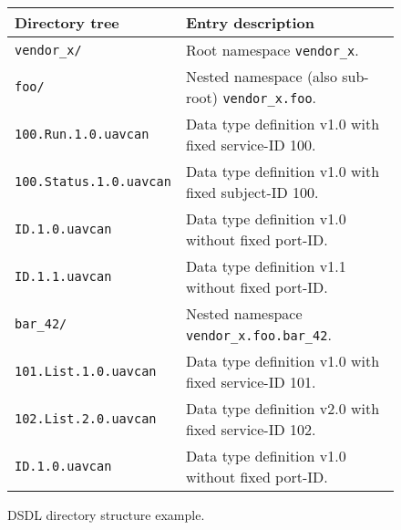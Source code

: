 \begin{remark}
    \begin{figure}[H]
        \begin{tabu}{|l|X|} \hline
            \rowfont{\bfseries}
            Directory tree & Entry description \\\hline

            \texttt{vendor\_x/} &
            Root namespace \texttt{vendor\_x}. \\

            \texttt{\qquad{}foo/} &
            Nested namespace (also sub-root) \texttt{vendor\_x.foo}. \\

            \texttt{\qquad{}\qquad{}100.Run.1.0.uavcan} &
            Data type definition v1.0 with fixed service-ID 100. \\

            \texttt{\qquad{}\qquad{}100.Status.1.0.uavcan} &
            Data type definition v1.0 with fixed subject-ID 100. \\

            \texttt{\qquad{}\qquad{}ID.1.0.uavcan} &
            Data type definition v1.0 without fixed port-ID. \\

            \texttt{\qquad{}\qquad{}ID.1.1.uavcan} &
            Data type definition v1.1 without fixed port-ID. \\

            \texttt{\qquad{}\qquad{}bar\_42/} &
            Nested namespace \texttt{vendor\_x.foo.bar\_42}. \\

            \texttt{\qquad{}\qquad{}\qquad{}101.List.1.0.uavcan} &
            Data type definition v1.0 with fixed service-ID 101. \\

            \texttt{\qquad{}\qquad{}\qquad{}102.List.2.0.uavcan} &
            Data type definition v2.0 with fixed service-ID 102. \\

            \texttt{\qquad{}\qquad{}\qquad{}ID.1.0.uavcan} &
            Data type definition v1.0 without fixed port-ID. \\\hline
        \end{tabu}
        \caption{DSDL directory structure example.}\label{fig:dsdl_directory_structure_example}
    \end{figure}
\end{remark}

